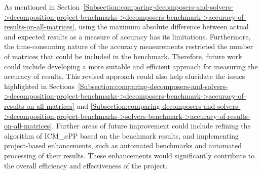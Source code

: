 As mentioned in Section~\ref{Subsection:comparing-decomposers-and-solvers->decomposition-project-benchmarks->decomposers-benchmark->accuracy-of-results-on-all-matrices}, using the maximum absolute difference between actual and expected results as a measure of accuracy has its limitations.
Furthermore, the time-consuming nature of the accuracy measurements restricted the number of matrices that could be included in the benchmark.
Therefore, future work could include developing a more suitable and efficient approach for measuring the accuracy of results.
This revised approach could also help elucidate the issues highlighted in Sections~\ref{Subsection:comparing-decomposers-and-solvers->decomposition-project-benchmarks->decomposers-benchmark->accuracy-of-results-on-all-matrices} and \ref{Subsection:comparing-decomposers-and-solvers->decomposition-project-benchmarks->solvers-benchmark->accuracy-of-results-on-all-matrices}.
Further areas of future improvement could include refining the algorithm of ICM\_$x$PP based on the benchmark results, and implementing project-based enhancements, such as automated benchmarks and automated processing of their results.
These enhancements would significantly contribute to the overall efficiency and effectiveness of the project.